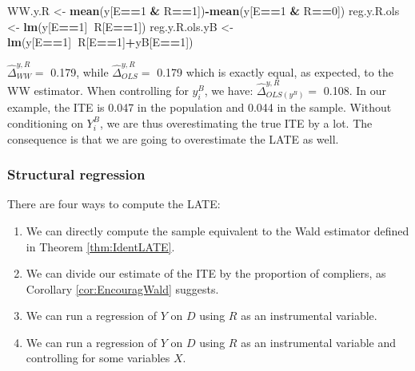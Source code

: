 \documentclass[]{book}
\newenvironment{Shaded}{\begin{snugshade}}{\end{snugshade}}
\newcommand{\KeywordTok}[1]{\textcolor[rgb]{0.13,0.29,0.53}{\textbf{#1}}}
\newcommand{\DecValTok}[1]{\textcolor[rgb]{0.00,0.00,0.81}{#1}}
\newcommand{\StringTok}[1]{\textcolor[rgb]{0.31,0.60,0.02}{#1}}
\newcommand{\OperatorTok}[1]{\textcolor[rgb]{0.81,0.36,0.00}{\textbf{#1}}}
\newcommand{\NormalTok}[1]{#1}
\providecommand{\tightlist}{%
  \setlength{\itemsep}{0pt}\setlength{\parskip}{0pt}}
\theoremstyle{definition}
\theoremstyle{definition}
\theoremstyle{definition}
\theoremstyle{remark}
\begin{document}
\begin{Shaded}
\begin{Highlighting}[]
\NormalTok{WW.y.R <-}\StringTok{ }\KeywordTok{mean}\NormalTok{(y[E}\OperatorTok{==}\DecValTok{1} \OperatorTok{&}\StringTok{ }\NormalTok{R}\OperatorTok{==}\DecValTok{1}\NormalTok{])}\OperatorTok{-}\KeywordTok{mean}\NormalTok{(y[E}\OperatorTok{==}\DecValTok{1} \OperatorTok{&}\StringTok{ }\NormalTok{R}\OperatorTok{==}\DecValTok{0}\NormalTok{])}
\NormalTok{reg.y.R.ols <-}\StringTok{ }\KeywordTok{lm}\NormalTok{(y[E}\OperatorTok{==}\DecValTok{1}\NormalTok{]}\OperatorTok{~}\NormalTok{R[E}\OperatorTok{==}\DecValTok{1}\NormalTok{])}
\NormalTok{reg.y.R.ols.yB <-}\StringTok{ }\KeywordTok{lm}\NormalTok{(y[E}\OperatorTok{==}\DecValTok{1}\NormalTok{]}\OperatorTok{~}\NormalTok{R[E}\OperatorTok{==}\DecValTok{1}\NormalTok{]}\OperatorTok{+}\NormalTok{yB[E}\OperatorTok{==}\DecValTok{1}\NormalTok{])}
\end{Highlighting}
\end{Shaded}

\(\hat{\Delta}^{y,R}_{WW} =\) 0.179, while \(\hat{\Delta}^{y,R}_{OLS}=\)
0.179 which is exactly equal, as expected, to the WW estimator. When
controlling for \(y^B_i\), we have: \(\hat{\Delta}^{y,R}_{OLS(y^B)}=\)
0.108. In our example, the ITE is 0.047 in the population and 0.044 in
the sample. Without conditioning on \(Y_i^B\), we are thus
overestimating the true ITE by a lot. The consequence is that we are
going to overestimate the LATE as well.

\subsubsection{Structural regression}\label{structural-regression}

There are four ways to compute the LATE:

\begin{enumerate}
\def\labelenumi{\arabic{enumi}.}
\tightlist
\item
  We can directly compute the sample equivalent to the Wald estimator
  defined in Theorem \ref{thm:IdentLATE}.
\item
  We can divide our estimate of the ITE by the proportion of compliers,
  as Corollary \ref{cor:EncouragWald} suggests.
\item
  We can run a regression of \(Y\) on \(D\) using \(R\) as an
  instrumental variable.
\item
  We can run a regression of \(Y\) on \(D\) using \(R\) as an
  instrumental variable and controlling for some variables \(X\).
\end{enumerate}
\end{document}
